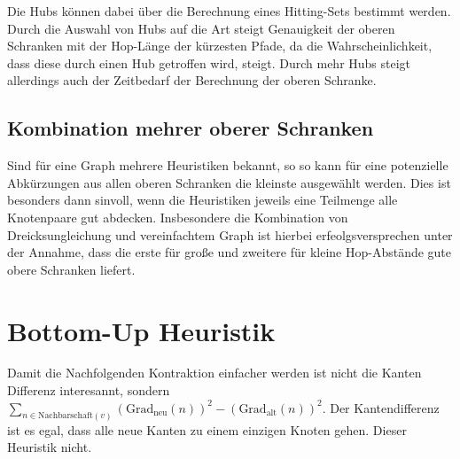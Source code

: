 Die Hubs können dabei über die Berechnung eines Hitting-Sets bestimmt werden.
Durch die Auswahl von Hubs auf die Art steigt Genauigkeit der oberen Schranken mit der Hop-Länge der kürzesten Pfade, da die Wahrscheinlichkeit, dass diese durch einen Hub getroffen wird, steigt.
Durch mehr Hubs steigt allerdings auch der Zeitbedarf der Berechnung der oberen Schranke.

\subsection{Kombination mehrer oberer Schranken}
Sind für eine Graph mehrere Heuristiken bekannt, so so kann für eine potenzielle Abkürzungen aus allen oberen Schranken die kleinste ausgewählt werden.
Dies ist besonders dann sinvoll, wenn die Heuristiken jeweils eine Teilmenge alle Knotenpaare gut abdecken.
Insbesondere die Kombination von Dreicksungleichung und vereinfachtem Graph ist hierbei erfeolgsversprechen unter der Annahme, dass die erste für große und zweitere für kleine Hop-Abstände gute obere Schranken liefert.

\section{Bottom-Up Heuristik}

Damit die Nachfolgenden Kontraktion einfacher werden ist nicht die Kanten Differenz interesannt, sondern $\sum_{n \in \text{Nachbarschaft}(v)} (\text{Grad}_\text{neu}(n))^2 - (\text{Grad}_\text{alt}(n))^2$.
Der Kantendifferenz ist es egal, dass alle neue Kanten zu einem einzigen Knoten gehen. Dieser Heuristik nicht.

